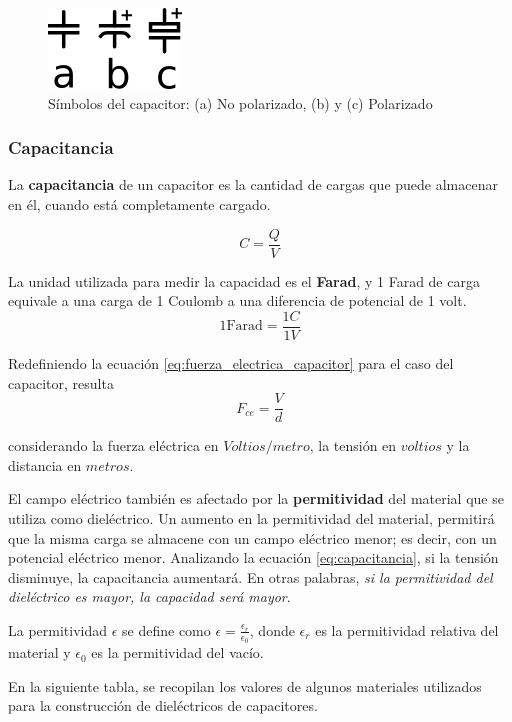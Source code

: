 \begin{figure}[htbp]
  \includegraphics[scale=1]{images/capacitor_simbolo}
  \caption{Símbolos del capacitor: (a) No polarizado, (b) y (c) Polarizado}
  \label{fig:cap_simbolos}
\end{figure}

\subsubsection{Capacitancia}

La \textbf{capacitancia} de un capacitor es la cantidad de cargas que puede almacenar en él, cuando está completamente cargado.

\begin{equation}
	\label{eq:capacitancia}
	C = \frac{Q}{V}
\end{equation}

La unidad utilizada para medir la capacidad es el \textbf{Farad}, y 1 Farad de carga equivale a una carga de 1 Coulomb a una diferencia de potencial de 1 volt.
$$ 1 \text{Farad} = \frac{1 C}{1 V}$$

Redefiniendo la ecuación \ref{eq:fuerza_electrica_capacitor} para el caso del capacitor, resulta
\begin{equation}
	F_{ce} = \frac{V}{d}
\end{equation}

considerando la fuerza eléctrica en $Voltios/metro$, la tensión en $voltios$ y la distancia en $metros$.

El campo eléctrico también es afectado por la \textbf{permitividad} del material que se utiliza como dieléctrico. Un aumento en la permitividad del material, permitirá que la misma carga se almacene con un campo eléctrico menor; es decir, con un potencial eléctrico menor. Analizando la ecuación \ref{eq:capacitancia}, si la tensión disminuye, la capacitancia aumentará. En otras palabras, \textit{si la permitividad del dieléctrico es mayor, la capacidad será mayor}.

La permitividad $\epsilon $ se define como $ \epsilon = \frac{\epsilon_r}{\epsilon_0}$, donde $\epsilon_r$ es la permitividad relativa del material y $\epsilon_0 $ es la permitividad del vacío.

En la siguiente tabla, se recopilan los valores de algunos materiales utilizados para la construcción de dieléctricos de capacitores.

